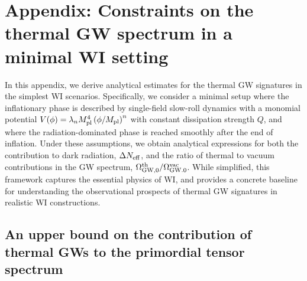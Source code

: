 \section{Appendix: Constraints on the thermal GW spectrum in a minimal WI setting}
\label{sec:ch7-appA}
In this appendix, we derive analytical estimates for the thermal GW signatures in the simplest WI scenarios. Specifically, we consider a minimal setup where the inflationary phase is described by single-field slow-roll dynamics with a monomial potential $V(\phi) = \lambda_n M_{\rm pl}^4\left(\phi/M_{\rm pl}\right)^n$ with constant dissipation strength $Q$, and where the radiation-dominated phase is reached smoothly after the end of inflation. Under these assumptions, we obtain analytical expressions for both the contribution to dark radiation, $\Delta N_{\rm eff}$, and the ratio of thermal to vacuum contributions in the GW spectrum, $\Omega_{\rm GW, 0}^{\rm th}/\Omega_{\rm GW. 0}^{\rm vac}$. While simplified, this framework captures the essential physics of WI, and provides a concrete baseline for understanding the observational prospects of thermal GW signatures in realistic WI constructions.

\subsection{An upper bound on the contribution of thermal GWs to the primordial tensor spectrum}\label{sec:ch7-A1}

